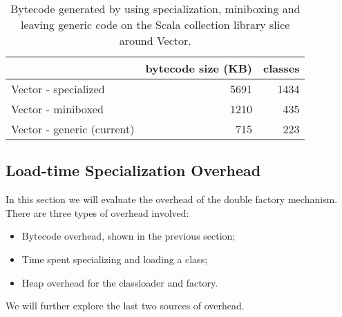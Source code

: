 \begin{table}[b!]
\centering
\small
\begin{tabular}{l|r|r}
                               &  bytecode size (KB) & classes \\\hline 
Vector - specialized           &                5691 &    1434 \\
\rowcolor{Gray}
Vector - miniboxed             &                1210 &     435 \\
Vector - generic (current)     &                 715 &     223 \\
\end{tabular}
\caption{Bytecode generated by using specialization, miniboxing and leaving generic code on the Scala collection library slice around Vector.}
\label{mbox:tbl-results-bytecode-vector}
\end{table}

\subsection{Load-time Specialization Overhead}
\label{mbox:subsec-eval-specialization}

In this section we will evaluate the overhead of the double factory mechanism. There are three types of overhead involved:
\begin{itemize}
  \item Bytecode overhead, shown in the previous section;
  \item Time spent specializing and loading a class;
  \item Heap overhead for the classloader and factory.
\end{itemize}

We will further explore the last two sources of overhead.

